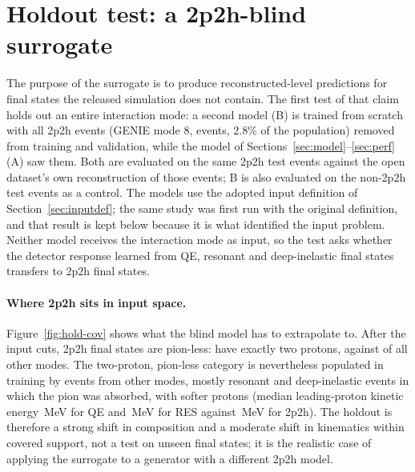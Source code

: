 \documentclass[11pt]{article}
\begin{document}
\begin{table}[h]\centering

\caption{Closure of the prong set and the vertex plane.}
\label{tab:closure2}
\end{table}
\FloatBarrier

\section{Holdout test: a 2p2h-blind surrogate}
\label{sec:holdout}

The purpose of the surrogate is to produce reconstructed-level predictions for final states the released
simulation does not contain. The first test of that claim holds out an entire interaction mode: a second model
(B) is trained from scratch with all 2p2h events (GENIE mode 8, \nHtwoP{} events, 2.8\% of the population)
removed from training and validation, while the model of Sections~\ref{sec:model}--\ref{sec:perf} (A) saw them.
Both are evaluated on the same \nHtest{} 2p2h test events against the open dataset's own reconstruction of those
events; B is also evaluated on the non-2p2h test events as a control. The models use the adopted input
definition of Section~\ref{sec:inputdef}; the same study was first run with the original definition, and that
result is kept below because it is what identified the input problem. Neither model receives the interaction
mode as input, so the test asks whether the detector response learned from QE, resonant and deep-inelastic
final states transfers to 2p2h final states.

\paragraph{Where 2p2h sits in input space.} Figure~\ref{fig:hold-cov} shows what the blind model has to
extrapolate to. After the input cuts, 2p2h final states are pion-less: \nHfracTwoPtwoph{} have exactly two
protons, against \nHfracTwoPother{} of all other modes. The two-proton, pion-less category is nevertheless
populated in training by \nHnTwoPother{} events from other modes, mostly resonant and deep-inelastic events in
which the pion was absorbed, with softer protons (median leading-proton kinetic energy \nHleadKEQE{}\,MeV for QE
and \nHleadKERES{}\,MeV for RES against \nHleadKETwoPTwoH{}\,MeV for 2p2h). The holdout is therefore a strong
shift in composition and a moderate shift in kinematics within covered support, not a test on unseen final
states; it is the realistic case of applying the surrogate to a generator with a different 2p2h model.
\end{document}
